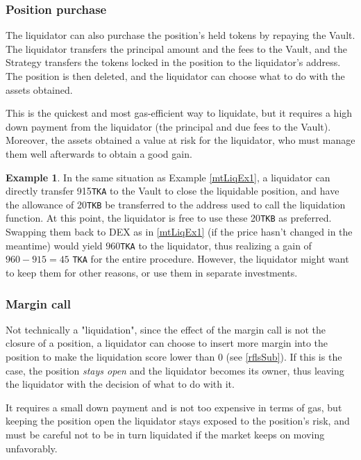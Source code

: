 \documentclass[a4paper,10 pt]{article}
\theoremstyle{definition}
\newtheorem{example}{Example}
\begin{document}
\subsubsection{Position purchase}\label{ppSubSub}
The liquidator can also purchase the position's held tokens by repaying the Vault. The liquidator transfers the principal amount and the fees to the Vault, and the Strategy transfers the tokens locked in the position to the liquidator's address. The position is then deleted, and the liquidator can choose what to do with the assets obtained.

 This is the quickest and most gas-efficient way to liquidate, but it requires a high down payment from the liquidator (the principal and due fees to the Vault). Moreover, the assets obtained a value at risk for the liquidator, who must manage them well afterwards to obtain a good gain.

\begin{example}\label{mtLiqEx2}
In the same situation as Example \ref{mtLiqEx1}, a liquidator can directly transfer 915\verb|TKA| to the Vault to close the liquidable position, and have the allowance of 20\verb|TKB| be transferred to the address used to call the liquidation function. At this point, the liquidator is free to use these 20\verb|TKB| as preferred. Swapping them back to DEX as in \ref{mtLiqEx1} (if the price hasn't changed in the meantime) would yield $960$\verb|TKA| to the liquidator, thus realizing a gain of $960-915 = 45$ \verb|TKA| for the entire procedure. However, the liquidator might want to keep them for other reasons, or use them in separate investments. 
\end{example}

\subsubsection{Margin call}\label{mcSubSub}
Not technically a "liquidation", since the effect of the margin call is not the closure of a position, a liquidator can choose to insert more margin into the position to make the liquidation score lower than $0$ (see \ref{rflsSub}). If this is the case, the position {\it stays open} and the liquidator becomes its owner, thus leaving the liquidator with the decision of what to do with it.

It requires a small down payment and is not too expensive in terms of gas, but keeping the position open the liquidator stays exposed to the position's risk, and must be careful not to be in turn liquidated if the market keeps on moving unfavorably.
\end{document}

